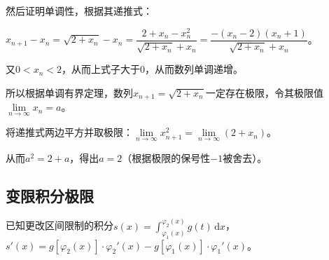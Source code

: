 \documentclass[UTF8, 12pt]{ctexart}
\begin{document}
然后证明单调性，根据其递推式：

$x_{n+1}-x_n=\sqrt{2+x_n}-x_n=\dfrac{2+x_n-x_n^2}{\sqrt{2+x_n}+x_n}=\dfrac{-(x_n-2)(x_n+1)}{\sqrt{2+x_n}+x_n}$。\medskip

又$0<x_n<2$，从而上式子大于0，从而数列单调递增。

所以根据单调有界定理，数列$x_{n+1}=\sqrt{2+x_n}$一定存在极限，令其极限值$\lim\limits_{n\to\infty}x_n=a$。

将递推式两边平方并取极限：$\lim\limits_{n\to\infty}x^2_{n+1}=\lim\limits_{n\to\infty}(2+x_n)$。

从而$a^2=2+a$，得出$a=2$（根据极限的保号性$-1$被舍去）。

\subsection{变限积分极限}

已知更改区间限制的积分$s(x)=\int_{\varphi_1(x)}^{\varphi_2(x)}g(t)\,\textrm{d}x$，$s'(x)=g[\varphi_2(x)]\cdot\varphi_2'(x)-g[\varphi_1(x)]\cdot\varphi_1'(x)$。
\end{document}

